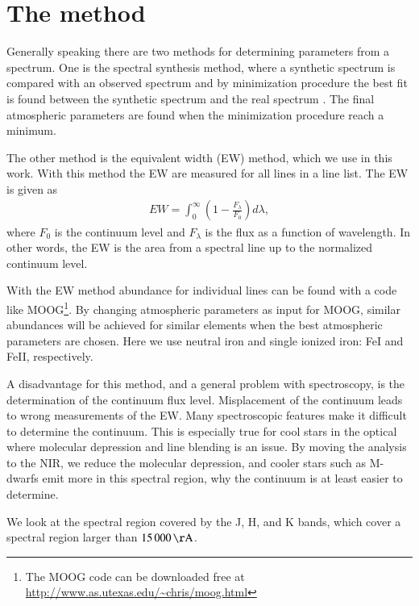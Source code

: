 \documentclass{aa}
\begin{document}
\section{The method}
\label{sec:the_method}

Generally speaking there are two methods for determining parameters from
a spectrum. One is the spectral synthesis method, where a synthetic
spectrum is compared with an observed spectrum and by minimization
procedure the best fit is found between the synthetic spectrum and the
real spectrum \citep[see e.g.][]{2012Onehag}. The final atmospheric
parameters are found when the minimization procedure reach a minimum.

The other method is the equivalent width (EW) method, which we use in this
work.  With this method the EW are measured for all lines in a line list. The
EW is given as
\begin{align}
    \label{eq:EW}
    EW = \int_0^\infty \left(1 - \frac{F_\lambda}{F_0}\right) d\lambda,
\end{align}
where $F_0$ is the continuum level and $F_\lambda$ is the flux as a function
of wavelength. In other words, the EW is the area from a spectral line up
to the normalized continuum level.

With the EW method abundance for individual lines can be found with a code like
MOOG\footnote{The MOOG code can be downloaded free at
\url{http://www.as.utexas.edu/~chris/moog.html}}. By changing atmospheric
parameters as input for MOOG, similar abundances will be achieved for similar
elements when the best atmospheric parameters are chosen. Here we use neutral
iron and single ionized iron: FeI and FeII, respectively.

A disadvantage for this method, and a general problem with spectroscopy,
is the determination of the continuum flux level. Misplacement of the
continuum leads to wrong measurements of the EW. Many spectroscopic
features make it difficult to determine the continuum. This is
especially true for cool stars in the optical where molecular depression
and line blending is an issue. By moving the analysis to the NIR, we
reduce the molecular depression, and cooler stars such as M-dwarfs emit
more in this spectral region, why the continuum is at least easier to
determine.

We look at the spectral region covered by the J, H, and K bands, which cover a
spectral region larger than $\SI{15000}{\AA}$.



\end{document}
